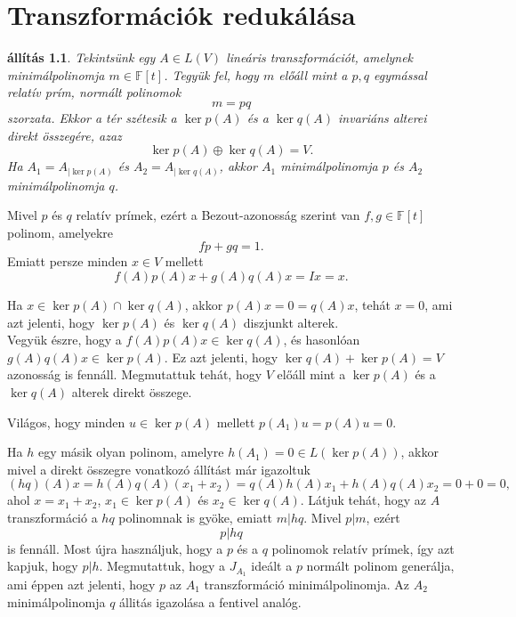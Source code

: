 \documentclass[a4paper, showtrims]{memoir}
\makeatletter
\renewenvironment{proof}[1][\proofname]
    {\par\pushQED{\qed}%
    \normalfont \topsep6\p@\@plus6\p@\relax
    \trivlist
    \item[\hskip\labelsep
        \itshape
    #1\@addpunct{:}]\ignorespaces}
    {\popQED\endtrivlist\@endpefalse}
\theoremstyle{plain}
\newtheorem{proposition}{állítás}[chapter]
\theoremstyle{remark}
\theoremstyle{definition}
\makeatother
\begin{document}
\chapter{Transzformációk redukálása}
\begin{proposition}
	Tekintsünk egy $A\in L\left( V \right)$ lineáris transzformációt,
	amelynek minimálpolinomja $m\in\mathbb{F}\left[ t \right]$.
	Tegyük fel, hogy $m$ előáll mint a $p,q$ egymással relatív prím, normált
	polinomok
	\[
		m=pq
	\]
	szorzata.
	Ekkor a tér szétesik a
	$\ker p\left( A \right)$ és a
	$\ker q\left( A \right)$ invariáns alterei direkt összegére, azaz
	\[
		\ker p\left( A \right)\oplus
		\ker q\left( A \right)=
		V.
	\]
	Ha $A_1=A_{|\ker p\left( A \right)}$ és
	$A_2=A_{|\ker q\left( A \right)}$, akkor $A_1$ minimálpolinomja $p$ és $A_2$ minimálpolinomja $q$.
\end{proposition}
\begin{proof}
	Mivel $p$ és $q$ relatív prímek, ezért a Bezout-azonosság szerint van $f,g\in\mathbb{F}\left[ t \right]$ polinom, amelyekre
	\[
		fp+gq=1.
	\]
	Emiatt persze minden $x\in V$ mellett
	\[
		f\left( A \right)p\left( A \right)x
		+
		g\left( A \right)q\left( A \right)x=Ix=x.\tag{\dag}
	\]

	Ha $x\in\ker p\left( A \right)\cap\ker q\left( A \right)$,
	akkor
	$p\left( A \right)x=0=q\left( A \right)x$, tehát $x=0$, ami azt jelenti, hogy
	$\ker p\left( A \right)$ és
	$\ker q\left( A \right)$ diszjunkt alterek.
	\\
	Vegyük észre, hogy a
	$f\left( A \right)p\left( A \right)x\in\ker q\left( A \right)$,
	és hasonlóan
	$g\left( A \right)q\left( A \right)x\in\ker p\left( A \right)$.
	Ez azt jelenti, hogy $\ker q\left( A \right)+\ker p\left( A \right)=V$ azonosság is fennáll.
	Megmutattuk tehát, hogy $V$ előáll mint a $\ker p\left( A \right)$ és a
	$\ker q\left( A \right)$ alterek direkt összege.

	Világos, hogy minden $u\in\ker p\left( A \right)$ mellett
	$p\left( A_1 \right)u
		=
		p\left( A \right)u=0$.

	Ha $h$ egy másik olyan polinom, amelyre $h\left( A_1 \right)=0\in L\left( \ker p\left( A \right) \right)$,
	akkor mivel a direkt összegre vonatkozó állítást már igazoltuk
	\[
		(hq)\left( A \right)x=
		h\left( A \right)q\left( A \right)\left( x_1+x_2 \right)
		=
		q\left( A \right)h\left( A \right)x_1
		+
		h\left( A \right)q\left( A \right)x_2
		=0+0
		=0,
	\]
	ahol $x=x_1+x_2$, $x_1\in \ker p\left( A \right)$ és
	$x_2\in\ker q\left( A \right)$.
	Látjuk tehát, hogy az $A$ transzformáció a $hq$ polinomnak is gyöke,
	emiatt $m|hq$.
	Mivel $p|m$, ezért
	\[p|hq\] is fennáll.
	Most újra használjuk, hogy a $p$ és a $q$ polinomok relatív prímek,
	így azt kapjuk, hogy $p|h.$
	Megmutattuk, hogy a $J_{A_1}$ ideált a $p$ normált polinom generálja,
	ami éppen azt jelenti, hogy $p$ az $A_1$ transzformáció minimálpolinomja.
	Az $A_2$ minimálpolinomja $q$ állitás igazolása a fentivel analóg.
\end{proof}
\end{document}
